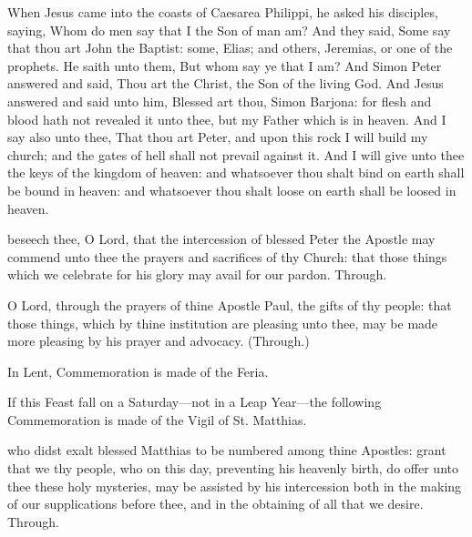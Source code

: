  When Jesus came into the coasts of Caesarea Philippi, he asked his disciples, saying, Whom do men say that I the Son of man am? And they said, Some say that thou art John the Baptist: some, Elias; and others, Jeremias, or one of the prophets. He saith unto them, But whom say ye that I am? And Simon Peter answered and said, Thou art the Christ, the Son of the living God. And Jesus answered and said unto him, Blessed art thou, Simon Barjona: for flesh and blood hath not revealed it unto thee, but my Father which is in heaven. And I say also unto thee, That thou art Peter, and upon this rock I will build my church; and the gates of hell shall not prevail against it. And I will give unto thee the keys of the kingdom of heaven: and whatsoever thou shalt bind on earth shall be bound in heaven: and whatsoever thou shalt loose on earth shall be loosed in heaven.

\clearpage
\secret
{} beseech thee, O Lord, that the intercession of blessed Peter the Apostle may commend unto thee the prayers and sacrifices of thy Church: that those things which we celebrate for his glory may avail for our pardon. Through.

 O Lord, through the prayers of thine Apostle Paul, the gifts of thy people: that those things, which by thine institution are pleasing unto thee, may be made more pleasing by his prayer and advocacy. (Through.)
\begin{rubric}
    In Lent, Commemoration is made of the Feria.%
\end{rubric}
\begin{rubric}
    If this Feast fall on a Saturday---not in a Leap Year---the following Commemoration is made of the Vigil of St. Matthias.
\end{rubric}

 who didst exalt blessed Matthias to be numbered among thine Apostles: grant that we thy people, who on this day, preventing his heavenly birth, do offer unto thee these holy mysteries, may be assisted by his intercession both in the making of our supplications before thee, and in the obtaining of all that we desire. Through.


